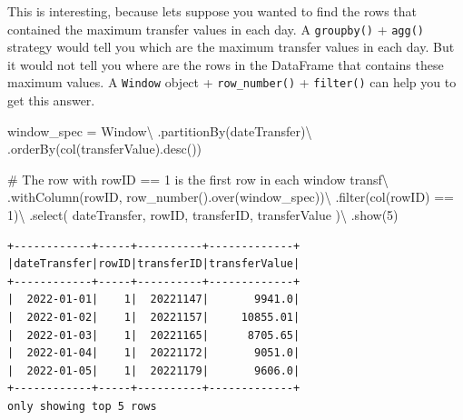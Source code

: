 \documentclass[
  11pt,
  letterpaper,
  DIV=11,
  numbers=noendperiod]{scrreprt}
\newenvironment{Shaded}{\begin{snugshade}}{\end{snugshade}}
\newcommand{\BuiltInTok}[1]{\textcolor[rgb]{0.00,0.23,0.31}{#1}}
\newcommand{\CommentTok}[1]{\textcolor[rgb]{0.37,0.37,0.37}{#1}}
\newcommand{\DecValTok}[1]{\textcolor[rgb]{0.68,0.00,0.00}{#1}}
\newcommand{\NormalTok}[1]{\textcolor[rgb]{0.00,0.23,0.31}{#1}}
\newcommand{\OperatorTok}[1]{\textcolor[rgb]{0.37,0.37,0.37}{#1}}
\newcommand{\StringTok}[1]{\textcolor[rgb]{0.13,0.47,0.30}{#1}}
\begin{document}
This is interesting, because lets suppose you wanted to find the rows
that contained the maximum transfer values in each day. A
\texttt{groupby()} + \texttt{agg()} strategy would tell you which are
the maximum transfer values in each day. But it would not tell you where
are the rows in the DataFrame that contains these maximum values. A
\texttt{Window} object + \texttt{row\_number()} + \texttt{filter()} can
help you to get this answer.

\begin{Shaded}
\begin{Highlighting}[]
\NormalTok{window\_spec }\OperatorTok{=}\NormalTok{ Window}\OperatorTok{\textbackslash{}}
\NormalTok{    .partitionBy(}\StringTok{\textquotesingle{}dateTransfer\textquotesingle{}}\NormalTok{)}\OperatorTok{\textbackslash{}}
\NormalTok{    .orderBy(col(}\StringTok{\textquotesingle{}transferValue\textquotesingle{}}\NormalTok{).desc())}

\CommentTok{\# The row with rowID == 1 is the first row in each window}
\NormalTok{transf}\OperatorTok{\textbackslash{}}
\NormalTok{    .withColumn(}\StringTok{\textquotesingle{}rowID\textquotesingle{}}\NormalTok{, row\_number().over(window\_spec))}\OperatorTok{\textbackslash{}}
\NormalTok{    .}\BuiltInTok{filter}\NormalTok{(col(}\StringTok{\textquotesingle{}rowID\textquotesingle{}}\NormalTok{) }\OperatorTok{==} \DecValTok{1}\NormalTok{)}\OperatorTok{\textbackslash{}}
\NormalTok{    .select(}
        \StringTok{\textquotesingle{}dateTransfer\textquotesingle{}}\NormalTok{, }\StringTok{\textquotesingle{}rowID\textquotesingle{}}\NormalTok{,}
        \StringTok{\textquotesingle{}transferID\textquotesingle{}}\NormalTok{, }\StringTok{\textquotesingle{}transferValue\textquotesingle{}}
\NormalTok{    )}\OperatorTok{\textbackslash{}}
\NormalTok{    .show(}\DecValTok{5}\NormalTok{)}
\end{Highlighting}
\end{Shaded}

\begin{verbatim}
+------------+-----+----------+-------------+
|dateTransfer|rowID|transferID|transferValue|
+------------+-----+----------+-------------+
|  2022-01-01|    1|  20221147|       9941.0|
|  2022-01-02|    1|  20221157|     10855.01|
|  2022-01-03|    1|  20221165|      8705.65|
|  2022-01-04|    1|  20221172|       9051.0|
|  2022-01-05|    1|  20221179|       9606.0|
+------------+-----+----------+-------------+
only showing top 5 rows
\end{verbatim}
\end{document}
